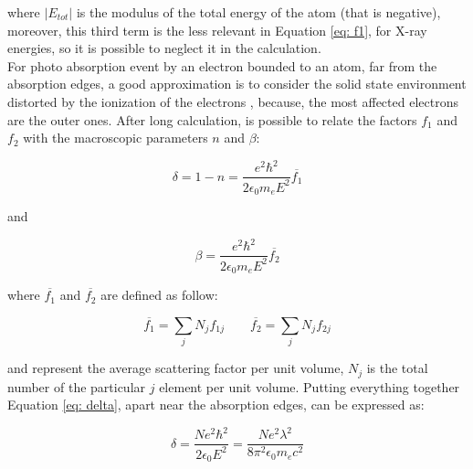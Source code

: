 \begin{flushleft}
where $|E_{tot} |$ is the modulus of the total energy of the atom (that is negative), moreover, this third term is the less relevant in Equation \ref{eq: f1}, for X-ray energies, so it is possible to neglect it in the calculation.
\\
For photo absorption event by an electron bounded to an atom, far from the absorption edges, a good approximation is to consider the solid state environment distorted by the ionization of the electrons , because, the most affected electrons are the outer ones. After long calculation, is possible to relate the factors $f_1 $ and $f_2 $ with the macroscopic parameters $n $ and $\beta $:
\end{flushleft}

\begin{equation}
\delta = 1 - n = \frac{e^2 \hbar^2}{2 \epsilon_0 m_e E^2} \overline{f_1}
\label{eq: delta}
\end{equation}

\begin{flushleft}
and
\end{flushleft}

\begin{equation}
\beta = \frac{e^2 \hbar^2}{2 \epsilon_0 m_e E^2} \overline{f_2}
\label{eq: beta}
\end{equation}

\begin{flushleft}
where $\overline{f_1} $ and $\overline{f_2} $ are defined as follow:
\end{flushleft}

\begin{equation}
\overline{f_1} = \sum_j N_j f_{1j} \qquad \overline{f_2} = \sum_j N_j f_{2j}
\label{f1, f2, mean}
\end{equation}

\begin{flushleft}
and represent the average scattering factor per unit volume, $N_j $ is the total number of the particular $j $ element per unit volume. Putting everything together Equation \ref{eq: delta}, apart near the absorption edges, can be expressed as:
\end{flushleft}

\begin{equation}
\delta = \frac{N e^2 \hbar^2}{2 \epsilon_0  E^2} = \frac{N e^2 \lambda^2}{8 \pi^2 \epsilon_0 m_e c^2}
\label{eq: delta new}
\end{equation}

